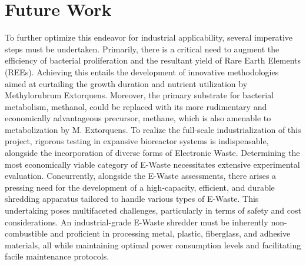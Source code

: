 \chapter{Future Work\authorB{}}

To further optimize this endeavor for industrial applicability, several imperative steps must be
undertaken. Primarily, there is a critical need to augment the efficiency of bacterial proliferation and
the resultant yield of Rare Earth Elements (REEs). Achieving this entails the development of
innovative methodologies aimed at curtailing the growth duration and nutrient utilization by
Methylorubrum Extorquens. Moreover, the primary substrate for bacterial metabolism, methanol,
could be replaced with its more rudimentary and economically advantageous precursor, methane,
which is also amenable to metabolization by M. Extorquens. To realize the full-scale industrialization
of this project, rigorous testing in expansive bioreactor systems is indispensable, alongside the
incorporation of diverse forms of Electronic Waste.
Determining the most economically viable category of E-Waste necessitates extensive experimental
evaluation. Concurrently, alongside the E-Waste assessments, there arises a pressing need for the
development of a high-capacity, efficient, and durable shredding apparatus tailored to handle various
types of E-Waste. This undertaking poses multifaceted challenges, particularly in terms of safety and
cost considerations. An industrial-grade E-Waste shredder must be inherently non-combustible and
proficient in processing metal, plastic, fiberglass, and adhesive materials, all while maintaining
optimal power consumption levels and facilitating facile maintenance protocols.